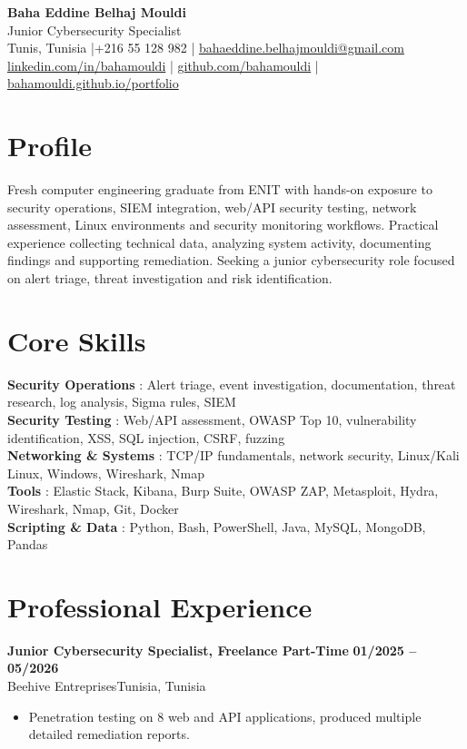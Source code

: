 \documentclass[a4paper,10pt]{article}
\newcommand{\cventry}[4]{%
  \textbf{#1} \hfill \textbf{#4}\\[1pt]
  #2{\ifx\relax#3\relax\else, #3\fi}\par\vspace{2pt}}
\begin{document}
\begin{center}
  {\LARGE\bfseries\color{navy} Baha Eddine Belhaj Mouldi}\\[4pt]
  {\large Junior Cybersecurity Specialist}\\[6pt]
  \normalsize
  Tunis, Tunisia \quad|\quad +216 55 128 982 \quad|\quad
  \href{mailto:bahaeddine.belhajmouldi@gmail.com}{bahaeddine.belhajmouldi@gmail.com}\\[2pt]
  \href{https://www.linkedin.com/in/bahamouldi}{linkedin.com/in/bahamouldi} \quad|\quad
  \href{https://github.com/bahamouldi}{github.com/bahamouldi} \quad|\quad
  \href{https://bahamouldi.github.io/portfolio/}{bahamouldi.github.io/portfolio}
\end{center}
\vspace{3pt}

\section{Profile}
Fresh computer engineering graduate from ENIT with hands-on exposure to security operations, SIEM integration, web/API security testing, network assessment, Linux environments and security monitoring workflows. Practical experience collecting technical data, analyzing system activity, documenting findings and supporting remediation. Seeking a junior cybersecurity role focused on alert triage, threat investigation and risk identification.

\section{Core Skills}
\textbf{Security Operations} : Alert triage, event investigation, documentation, threat research, log analysis, Sigma rules, SIEM\\[1pt]
\textbf{Security Testing} : Web/API assessment, OWASP Top 10, vulnerability identification, XSS, SQL injection, CSRF, fuzzing\\[1pt]
\textbf{Networking \& Systems} : TCP/IP fundamentals, network security, Linux/Kali Linux, Windows, Wireshark, Nmap\\[1pt]
\textbf{Tools} : Elastic Stack, Kibana, Burp Suite, OWASP ZAP, Metasploit, Hydra, Wireshark, Nmap, Git, Docker\\[1pt]
\textbf{Scripting \& Data} : Python, Bash, PowerShell, Java, MySQL, MongoDB, Pandas

\section{Professional Experience}
\cventry{Junior Cybersecurity Specialist, Freelance Part-Time}{Beehive Entreprises}{Tunisia}{01/2025 -- 05/2026}
\begin{itemize}
  \item Penetration testing on 8 web and API applications, produced multiple detailed remediation reports.
\end{itemize}
\end{document}
